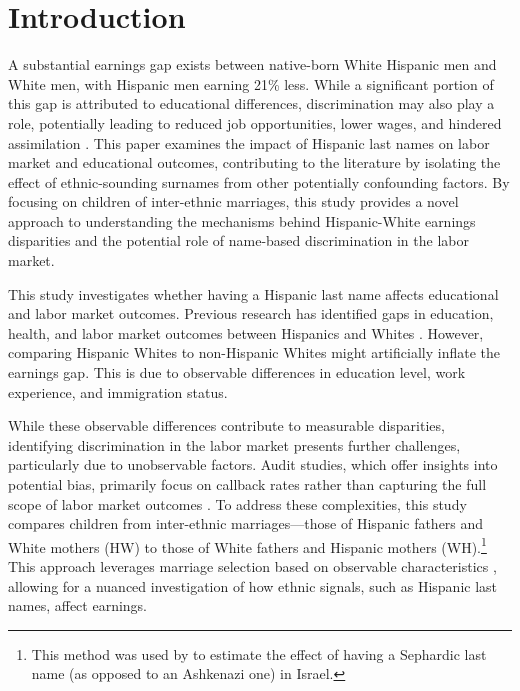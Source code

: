 \documentclass[a4paper,fleqn]{cas-sc}
\begin{document}

\section{Introduction}

A substantial earnings gap exists between native-born White Hispanic men and White men, with Hispanic men earning 21\% less. While a significant portion of this gap is attributed to educational differences, discrimination may also play a role, potentially leading to reduced job opportunities, lower wages, and hindered assimilation \citep{duncan2006hispanics, duncan2018identifying, duncan2018socioeconomic}. This paper examines the impact of Hispanic last names on labor market and educational outcomes, contributing to the literature by isolating the effect of ethnic-sounding surnames from other potentially confounding factors. By focusing on children of inter-ethnic marriages, this study provides a novel approach to understanding the mechanisms behind Hispanic-White earnings disparities and the potential role of name-based discrimination in the labor market.

This study investigates whether having a Hispanic last name affects educational and labor market outcomes. Previous research has identified gaps in education, health, and labor market outcomes between Hispanics and Whites \citep{antman2020ethnic, davilaChangesRelativeEarnings2008}. However, comparing Hispanic Whites to non-Hispanic Whites might artificially inflate the earnings gap. This is due to observable differences in education level, work experience, and immigration status.

While these observable differences contribute to measurable disparities, identifying discrimination in the labor market presents further challenges, particularly due to unobservable factors. Audit studies, which offer insights into potential bias, primarily focus on callback rates rather than capturing the full scope of labor market outcomes \citep{bertrand2004emily}. To address these complexities, this study compares children from inter-ethnic marriages—those of Hispanic fathers and White mothers (HW) to those of White fathers and Hispanic mothers (WH).\footnote{This method was used by \citet{rubinstein2014pride} to estimate the effect of having a Sephardic last name (as opposed to an Ashkenazi one) in Israel.} This approach leverages marriage selection based on observable characteristics \citep{averettBetterWorseRelationship2008}, allowing for a nuanced investigation of how ethnic signals, such as Hispanic last names, affect earnings.
\end{document}
